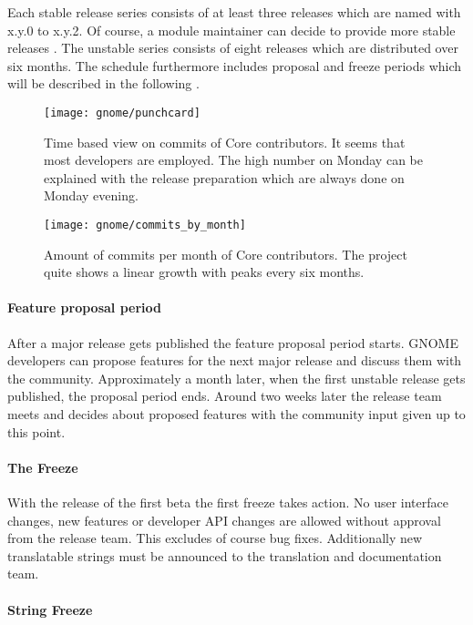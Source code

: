 Each stable release series consists of at least three releases which are named
with x.y.0 to x.y.2. Of course, a module maintainer can decide to provide more
stable releases \cite{GNOMEReleaseTeam}. The unstable series consists of eight
releases which are distributed over six months. The schedule furthermore
includes proposal and freeze periods which will be described in the following
\cite{GNOMEDevelopmentSchedule,GNOMESchedule}.

\begin{figure}[hbtp]
  \centering
  \texttt{[image: gnome/punchcard]}
  \caption{Time based view on commits of Core contributors. It seems that most
  developers are employed. The high number on Monday can be explained with the
  release preparation which are always done on Monday evening.}
\end{figure}

\begin{figure}[htbp]
  \centering
  \texttt{[image: gnome/commits\_by\_month]}
  \caption{Amount of commits per month of Core contributors. The project quite shows
  a linear growth with peaks every six months.}
\end{figure}

\paragraph{Feature proposal period}

After a major release gets published the feature proposal period starts. GNOME
developers can propose features for the next major release and discuss them
with the community. Approximately a month later, when the first unstable
release gets published, the proposal period ends. Around two weeks later the
release team meets and decides about proposed features with the community input
given up to this point.

\paragraph{The Freeze}

With the release of the first beta the first freeze takes action. No user
interface changes, new features or developer \ac{API} changes are allowed
without approval from the release team. This excludes of course bug fixes.
Additionally new translatable strings must be announced to the translation and
documentation team.

\paragraph{String Freeze}

